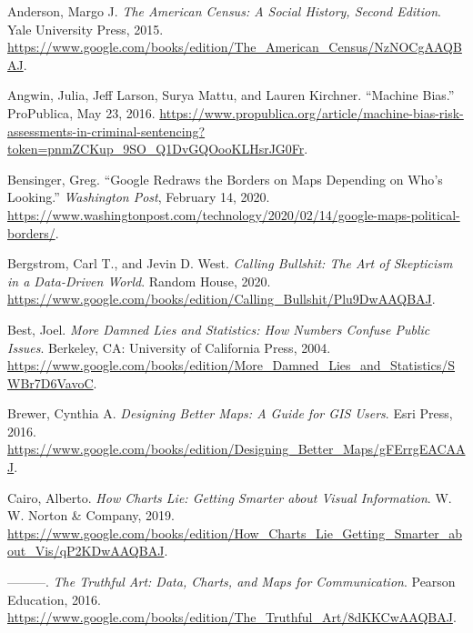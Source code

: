 \documentclass[
  english,
]{book}
\newlength{\cslhangindent}
\newlength{\cslentryspacingunit} %
\newenvironment{CSLReferences}[2] %
 {%
  \setlength{\parindent}{0pt}
  \ifodd #1
  \let\oldpar\par
  \def\par{\hangindent=\cslhangindent\oldpar}
  \fi
  \setlength{\parskip}{#2\cslentryspacingunit}
 }%
 {}
\begin{document}
\hypertarget{refs}{}
\begin{CSLReferences}{1}{0}
\leavevmode{}%
Anderson, Margo J. \emph{The {American Census}: {A Social History}, {Second Edition}}. {Yale University Press}, 2015. \url{https://www.google.com/books/edition/The_American_Census/NzNOCgAAQBAJ}.

\leavevmode{}%
Angwin, Julia, Jeff Larson, Surya Mattu, and Lauren Kirchner. {``Machine {Bias}.''} {ProPublica}, May 23, 2016. \url{https://www.propublica.org/article/machine-bias-risk-assessments-in-criminal-sentencing?token=pnmZCKup_9SO_Q1DvGQOooKLHsrJG0Fr}.

\leavevmode{}%
Bensinger, Greg. {``Google {Redraws} the {Borders} on {Maps Depending} on {Who}'s {Looking}.''} \emph{Washington Post}, February 14, 2020. \url{https://www.washingtonpost.com/technology/2020/02/14/google-maps-political-borders/}.

\leavevmode{}%
Bergstrom, Carl T., and Jevin D. West. \emph{Calling {Bullshit}: {The Art} of {Skepticism} in a {Data}-{Driven World}}. {Random House}, 2020. \url{https://www.google.com/books/edition/Calling_Bullshit/Plu9DwAAQBAJ}.

\leavevmode{}%
Best, Joel. \emph{More {Damned Lies} and {Statistics}: {How Numbers Confuse Public Issues}}. {Berkeley, CA}: {University of California Press}, 2004. \url{https://www.google.com/books/edition/More_Damned_Lies_and_Statistics/SWBr7D6VavoC}.

\leavevmode{}%
Brewer, Cynthia A. \emph{Designing {Better Maps}: {A Guide} for {GIS Users}}. {Esri Press}, 2016. \url{https://www.google.com/books/edition/Designing_Better_Maps/gFErrgEACAAJ}.

\leavevmode{}%
Cairo, Alberto. \emph{How {Charts Lie}: {Getting Smarter} about {Visual Information}}. {W. W. Norton \& Company}, 2019. \url{https://www.google.com/books/edition/How_Charts_Lie_Getting_Smarter_about_Vis/qP2KDwAAQBAJ}.

\leavevmode{}%
---------. \emph{The {Truthful Art}: {Data}, {Charts}, and {Maps} for {Communication}}. {Pearson Education}, 2016. \url{https://www.google.com/books/edition/The_Truthful_Art/8dKKCwAAQBAJ}.


\end{CSLReferences}
\end{document}
